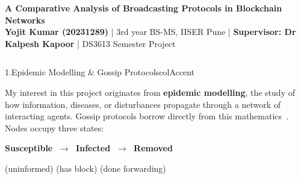 \documentclass[final]{beamer}
\newcommand{\pbody}{\fontsize{21}{27}\selectfont}
\newcommand{\psmall}{\fontsize{17}{23}\selectfont}
\newlength{\colwidth}
\begin{document}
\begin{frame}[t]

\begin{tcolorbox}[
  enhanced, colback=colHeaderBg, colframe=colHeaderBg,
  arc=0pt, boxrule=0pt,
  width=0.97\paperwidth, left=18mm, right=18mm, top=12mm, bottom=12mm
  ]
  {\color{white}\fontsize{54}{64}\bfseries\selectfont
    A Comparative Analysis of Broadcasting Protocols in Blockchain Networks}\\[6pt]
  {\color{white}\fontsize{22}{30}\selectfont
    \textbf{Yojit Kumar (20231289)} \quad|\quad
    3rd year BS-MS, IISER Pune \quad|\quad
    \textbf{Supervisor: Dr Kalpesh Kapoor} \quad|\quad
    DS3613 Semester Project}
\end{tcolorbox}


\vspace{7mm}


\begin{columns}[T, totalwidth=0.97\paperwidth]

\begin{column}{\colwidth}

\begin{panel}{1.\enspace Epidemic Modelling \& Gossip Protocols}{colAccent}
  \pbody\justifying

  My interest in this project originates from \textbf{epidemic modelling}, the study of how information, diseases, or disturbances propagate through a network of interacting agents. Gossip protocols borrow directly from this mathematics~\cite{demers1987}.
  Nodes occupy three states:
      
  \vspace{5pt}
      
  \begin{center}\pbody
    \textbf{Susceptible} $\;\longrightarrow\;$
    \textbf{Infected} $\;\longrightarrow\;$
    \textbf{Removed}
  \end{center}
  \begin{center}\psmall\color{gray}
    (uninformed) \hspace{28pt} (has block) \hspace{20pt} (done forwarding)
  \end{center}

  \vspace{7pt}


\end{panel}
\end{column}
\end{columns}
\end{frame}
\end{document}
